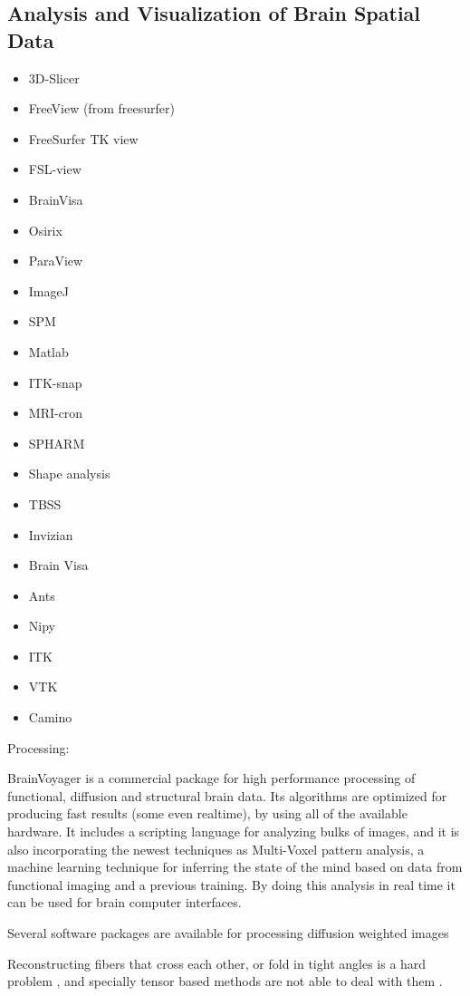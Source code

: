 \subsection{Analysis and Visualization of Brain Spatial Data}
\begin{itemize}
	\item 3D-Slicer
	\item FreeView (from freesurfer)
	\item FreeSurfer TK view
	\item FSL-view
	\item BrainVisa
	\item Osirix
	\item ParaView
	\item ImageJ
	\item SPM
	\item Matlab
	\item ITK-snap
	\item MRI-cron
	\item SPHARM
	\item Shape analysis	
	\item TBSS
	\item Invizian
	\item Brain Visa
	\item Ants
	\item Nipy
	\item ITK
	\item VTK
	\item Camino
\end{itemize}


Processing:

BrainVoyager \autocite{goebel_brainvoyagerpast_2012} is a commercial package for high performance processing of functional, diffusion and structural brain data. Its algorithms are optimized for producing fast results (some even realtime), by using all of the available hardware. It includes a scripting language for analyzing bulks of images, and it is also incorporating the newest techniques as Multi-Voxel pattern analysis, a machine learning technique for inferring the state of the mind based on data from functional imaging and a previous training. By doing this analysis in real time it can be used for brain computer interfaces. 


Several software packages are available for processing diffusion weighted images \autocite{hasan_review_2011}

Reconstructing fibers that cross each other, or fold in tight angles is a hard problem \autocite{fillard_quantitative_2011}, and specially tensor based methods are not able to deal with them \autocite{tournier_diffusion_2011}.


